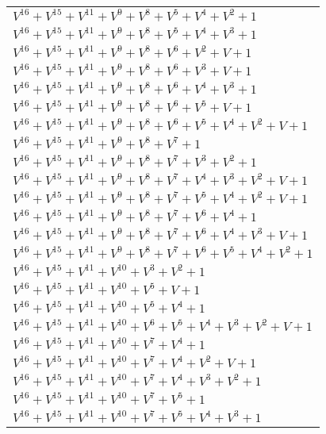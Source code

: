 \documentclass[12pt]{article}
\begin{document}
\begin{adjustwidth}{-4cm}{}
\begin{center}
\begin{longtable}{|l|}
$V^{16}  +V^{15}  +V^{11}  +V^{9}  +V^{8}  +V^{5}  +V^{4}  +V^{2}  + 1$ \\
$V^{16}  +V^{15}  +V^{11}  +V^{9}  +V^{8}  +V^{5}  +V^{4}  +V^{3}  + 1$ \\
$V^{16}  +V^{15}  +V^{11}  +V^{9}  +V^{8}  +V^{6}  +V^{2}  + V + 1$ \\
$V^{16}  +V^{15}  +V^{11}  +V^{9}  +V^{8}  +V^{6}  +V^{3}  + V + 1$ \\
$V^{16}  +V^{15}  +V^{11}  +V^{9}  +V^{8}  +V^{6}  +V^{4}  +V^{3}  + 1$ \\
$V^{16}  +V^{15}  +V^{11}  +V^{9}  +V^{8}  +V^{6}  +V^{5}  + V + 1$ \\
$V^{16}  +V^{15}  +V^{11}  +V^{9}  +V^{8}  +V^{6}  +V^{5}  +V^{4}  +V^{2}  + V + 1$ \\
$V^{16}  +V^{15}  +V^{11}  +V^{9}  +V^{8}  +V^{7}  + 1$ \\
$V^{16}  +V^{15}  +V^{11}  +V^{9}  +V^{8}  +V^{7}  +V^{3}  +V^{2}  + 1$ \\
$V^{16}  +V^{15}  +V^{11}  +V^{9}  +V^{8}  +V^{7}  +V^{4}  +V^{3}  +V^{2}  + V + 1$ \\
$V^{16}  +V^{15}  +V^{11}  +V^{9}  +V^{8}  +V^{7}  +V^{5}  +V^{4}  +V^{2}  + V + 1$ \\
$V^{16}  +V^{15}  +V^{11}  +V^{9}  +V^{8}  +V^{7}  +V^{6}  +V^{4}  + 1$ \\
$V^{16}  +V^{15}  +V^{11}  +V^{9}  +V^{8}  +V^{7}  +V^{6}  +V^{4}  +V^{3}  + V + 1$ \\
$V^{16}  +V^{15}  +V^{11}  +V^{9}  +V^{8}  +V^{7}  +V^{6}  +V^{5}  +V^{4}  +V^{2}  + 1$ \\
$V^{16}  +V^{15}  +V^{11}  +V^{10}  +V^{3}  +V^{2}  + 1$ \\
$V^{16}  +V^{15}  +V^{11}  +V^{10}  +V^{5}  + V + 1$ \\
$V^{16}  +V^{15}  +V^{11}  +V^{10}  +V^{5}  +V^{4}  + 1$ \\
$V^{16}  +V^{15}  +V^{11}  +V^{10}  +V^{6}  +V^{5}  +V^{4}  +V^{3}  +V^{2}  + V + 1$ \\
$V^{16}  +V^{15}  +V^{11}  +V^{10}  +V^{7}  +V^{4}  + 1$ \\
$V^{16}  +V^{15}  +V^{11}  +V^{10}  +V^{7}  +V^{4}  +V^{2}  + V + 1$ \\
$V^{16}  +V^{15}  +V^{11}  +V^{10}  +V^{7}  +V^{4}  +V^{3}  +V^{2}  + 1$ \\
$V^{16}  +V^{15}  +V^{11}  +V^{10}  +V^{7}  +V^{5}  + 1$ \\
$V^{16}  +V^{15}  +V^{11}  +V^{10}  +V^{7}  +V^{5}  +V^{4}  +V^{3}  + 1$ \\

\end{longtable}
\end{center}
\end{adjustwidth}
\end{document}

